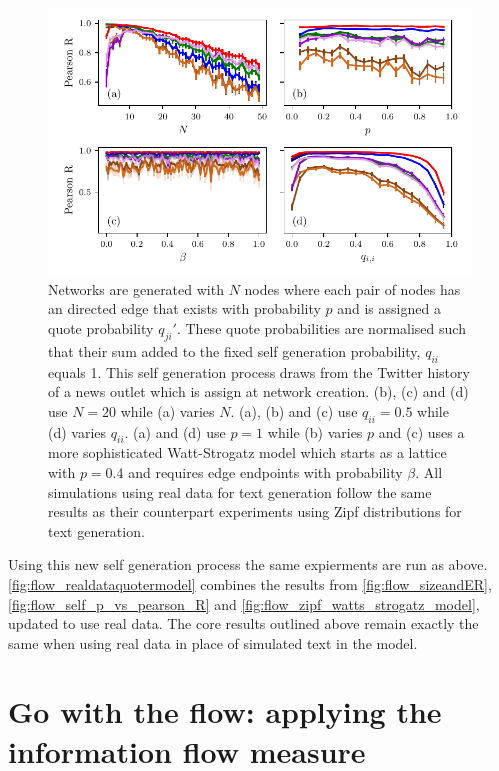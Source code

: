 \begin{figure}[!htbp]
	\centering
	\includegraphics{./chapter3/figs/real_data_simulations.pdf}
	\caption{Networks are generated with $N$ nodes where each pair of nodes has an directed edge that exists with probability $p$ and is assigned a quote probability $q_{ji}'$. These quote probabilities are normalised such that their sum added to the fixed self generation probability, $q_{ii}$ equals 1. This self generation process draws from the Twitter history of a news outlet which is assign at network creation. (b), (c) and (d) use $N=20$ while (a) varies $N$. (a), (b) and (c) use $q_{ii}=0.5$ while (d) varies $q_{ii}$.  (a) and (d) use $p=1$ while (b) varies $p$ and (c) uses a more sophisticated Watt-Strogatz model which starts as a lattice with $p=0.4$ and requires edge endpoints with probability $\beta$. All simulations using real data for text generation follow the same results as their counterpart experiments using Zipf distributions for text generation.}
	\label{fig:flow_realdataquotermodel}
\end{figure}

Using this new self generation process the same expierments are run as above. \autoref{fig:flow_realdataquotermodel} combines the results from \autoref{fig:flow_sizeandER}, \autoref{fig:flow_self_p_vs_pearson_R} and \autoref{fig:flow_zipf_watts_strogatz_model}, updated to use real data. The core results outlined above remain exactly the same when using real data in place of simulated text in the model. 


\section{Go with the flow: applying the information flow measure}\label{sec:gowiththeflow}
